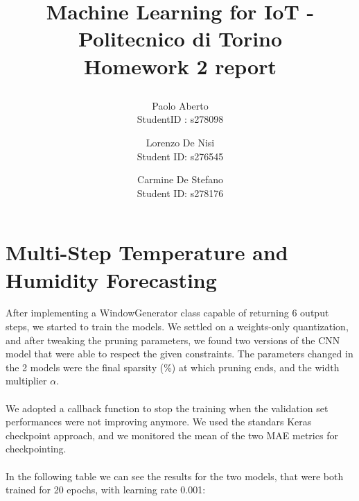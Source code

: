 \documentclass{article}
\date{}
\begin{document}
\author{Paolo Aberto\\
StudentID : s278098\\

\and
Lorenzo De Nisi\\
Student ID: s276545\\

\and
Carmine De Stefano\\
Student ID: s278176\\
}

\justifying

\title{
    \vspace{0.8cm}
    
    Machine Learning for IoT - 
    Politecnico di Torino\\
    \vspace{.5cm}
    \Large \textbf{Homework 2 report}
    \vspace{.1cm}
}

\maketitle
\thispagestyle{empty} 
\vspace{-0.9cm}


\section{Multi-Step Temperature and Humidity Forecasting}
After implementing a WindowGenerator class capable of returning 6 output steps, we started to train the models. We settled on a weights-only quantization, and after tweaking the pruning parameters, we found two versions of the CNN model that were able to respect the given constraints.
The parameters changed in the 2 models were the final sparsity (\%) at which pruning ends, and the width multiplier $\alpha$.
\\\\
We adopted a callback function to stop the training when the validation set performances were not improving anymore. We used the standars Keras checkpoint approach, and we monitored the mean of the two MAE metrics for checkpointing. 
\\\\
In the following table we can see the results for the two models, that were both trained for 20 epochs, with learning rate 0.001:

\vspace{0.2cm}
\end{document}
